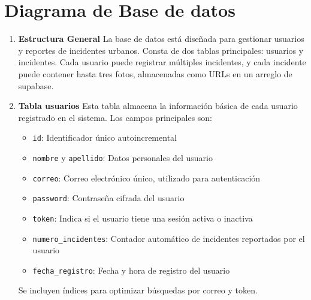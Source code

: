 \section{Diagrama de Base de datos}

\begin{enumerate}
    \item \textbf{Estructura General}
    La base de datos está diseñada para gestionar usuarios y reportes de incidentes urbanos. Consta de dos tablas principales: usuarios y incidentes. Cada usuario puede registrar múltiples incidentes, y cada incidente puede contener hasta tres fotos, almacenadas como URLs en un arreglo de supabase.

    \item \textbf{Tabla usuarios}
    Esta tabla almacena la información básica de cada usuario registrado en el sistema. Los campos principales son:
    \begin{itemize}
        \item \texttt{id}: Identificador único autoincremental
        \item \texttt{nombre} y \texttt{apellido}: Datos personales del usuario
        \item \texttt{correo}: Correo electrónico único, utilizado para autenticación
        \item \texttt{password}: Contraseña cifrada del usuario
        \item \texttt{token}: Indica si el usuario tiene una sesión activa o inactiva 
        \item \texttt{numero\_incidentes}: Contador automático de incidentes reportados por el usuario
        \item \texttt{fecha\_registro}: Fecha y hora de registro del usuario
    \end{itemize}
    Se incluyen índices para optimizar búsquedas por correo y token.


\end{enumerate}
